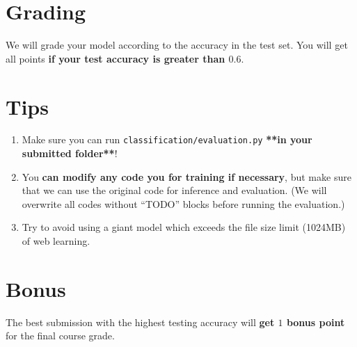 \documentclass{article}
\begin{document}
\section{Grading}
We will grade your model according to the accuracy in the
test set. You will get all points \textbf{if your test accuracy is greater than $0.6$}.

\section{Tips}
\begin{enumerate}
    \item 
    Make sure you can run \texttt{classification/evaluation.py} \textbf{**in your submitted folder**}!
    \item
    You \textbf{can modify any code you for training if necessary}, but make sure that we can use the original code for inference and evaluation. (We will overwrite all codes without ``TODO'' blocks before running the evaluation.)
    \item
    Try to avoid using a giant model which exceeds the file size limit (1024MB) of web learning.
\end{enumerate}

\section{Bonus}
The best submission with the highest testing accuracy will \textbf{get $1$ bonus
point} for the final course grade.
\end{document}
